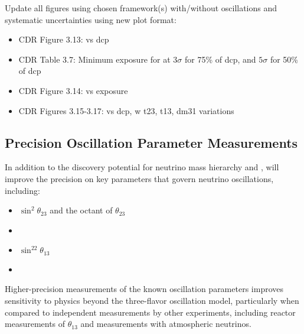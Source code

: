  Update all figures using chosen framework(s) with/without oscillations and systematic uncertainties using new plot format:
\begin{itemize}
	\item CDR Figure 3.13: vs dcp
	\item CDR Table 3.7: Minimum exposure for  at $3\sigma$ for 75\% of dcp, and $5\sigma$ for 50\% of dcp
	\item CDR Figure 3.14: vs exposure
	\item CDR Figures 3.15-3.17: vs dcp, w t23, t13, dm31 variations
\end{itemize}

\subsection{Precision Oscillation Parameter Measurements}
\label{sec:physics-lbnosc-prec}

In addition to the discovery potential for neutrino mass hierarchy and , 
 will improve the precision on key parameters that govern neutrino oscillations, including:
\begin{itemize}
 \item $\sin^2\theta_{23}$ and the octant of $\theta_{23}$
 \item \deltacp
 \item $\sin^22\theta_{13}$
 \item {}
\end{itemize}

Higher-precision measurements of the known oscillation parameters improves sensitivity to physics beyond the three-flavor oscillation model, particularly when compared to independent measurements by other experiments, including reactor measurements of $\theta_{13}$ and
measurements with atmospheric neutrinos. 

